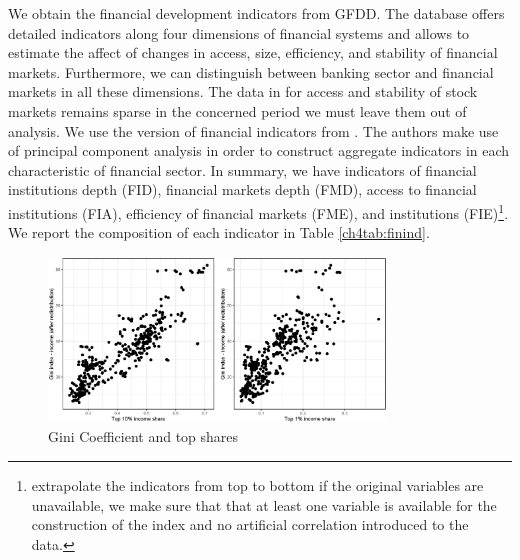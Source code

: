 \begin{refsection}
We obtain the financial development indicators from \ac{GFDD}. The database offers detailed indicators along four dimensions of financial systems and allows to estimate the affect of changes in access, size, efficiency, and stability of financial markets. Furthermore, we can distinguish between banking sector and financial markets in all these dimensions. The data in for access and stability of stock markets remains sparse in the concerned period we must leave them out of analysis. We use the version of financial indicators from \cite{svirydzenka2016introducing}. The authors make use of principal component analysis in order to construct aggregate indicators in each characteristic of financial sector. In summary, we have indicators of financial institutions depth (FID), financial markets depth (FMD), access to financial institutions (FIA), efficiency of financial markets (FME), and institutions (FIE)\footnote{\textcite{svirydzenka2016introducing} extrapolate the indicators from top to bottom if the original variables are unavailable, we make sure that that at least one variable is available for the construction of the index and no artificial correlation introduced to the data.}. We report the composition of each indicator in Table \ref{ch4tab:finind}. 

\begin{figure}[ht!]
  \caption{Gini Coefficient and top shares}
  \label{ch4fig:gini_topshares}
  \centering
  \includegraphics[width=0.8\textwidth, keepaspectratio]{figures/ch4/plots_ineq}
\end{figure}



\end{refsection}
